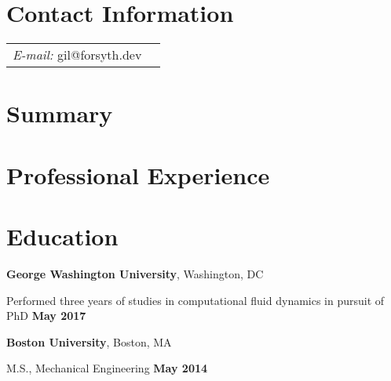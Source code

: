 \documentclass[margin,line]{res}
\newenvironment{list1}{
  \begin{list}{\ding{113}}{%
      \setlength{\itemsep}{0in}
      \setlength{\parsep}{0in} \setlength{\parskip}{0in}
      \setlength{\topsep}{0in} \setlength{\partopsep}{0in}
      \setlength{\leftmargin}{0.17in}}}{\end{list}}
\begin{document}
\newcommand{\link}[1]{\texttt{#1}}
\providecommand{\tightlist}{%
      \setlength{\itemsep}{0pt}\setlength{\parskip}{0pt}}



\begin{resume}
\section{\sc Contact Information}
\vspace{.05in}
\begin{tabular}{@{}p{2in}p{4in}}
{\it E-mail:}  gil@forsyth.dev
\end{tabular}


\section{\sc Summary}



\section{\sc Professional Experience}






\section{\sc Education}
\textbf {George Washington University}, Washington, DC\\
\vspace*{-.1in}
\begin{list1}
\item[] Performed three years of studies in computational fluid dynamics in pursuit of PhD \hfill \textbf{ May 2017}
\end{list1}

\textbf {Boston University}, Boston, MA\\
\vspace*{-.1in}
\begin{list1}
\item[] M.S., Mechanical Engineering \hfill \textbf{ May 2014}
\end{list1}


\end{resume}
\end{document}
